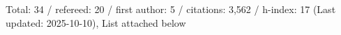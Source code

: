 Total: 34 / refereed: 20 / first author: 5 / citations: 3,562 / h-index: 17 (Last updated: 2025-10-10), List attached below